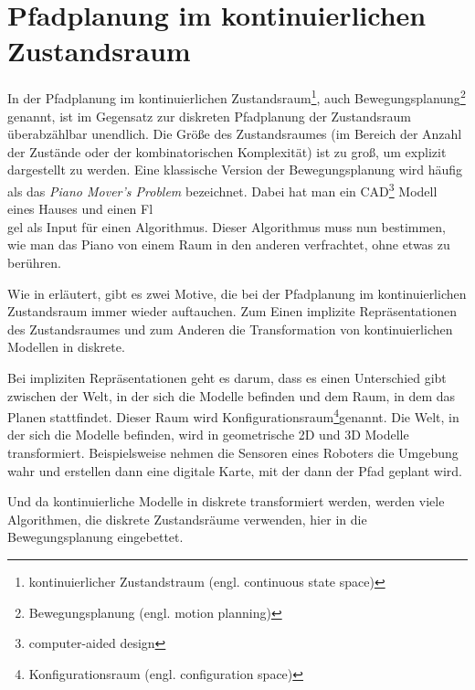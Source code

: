 \section{Pfadplanung im kontinuierlichen Zustandsraum} \label{Kapitel 4.4}
In der Pfadplanung im kontinuierlichen Zustandsraum\footnote{kontinuierlicher Zustandstraum (engl. continuous state space)}, auch Bewegungsplanung\footnote{Bewegungsplanung (engl. motion planning)} genannt, ist im Gegensatz zur diskreten Pfadplanung der Zustandsraum überabzählbar unendlich. Die Größe des Zustandsraumes (im Bereich der Anzahl der Zustände oder der kombinatorischen Komplexität) ist zu groß, um explizit dargestellt zu werden. \cite[~S. 17]{Lav06}
Eine klassische Version der Bewegungsplanung wird häufig als das \textit{Piano Mover's Problem} bezeichnet. Dabei hat man ein CAD\footnote{computer-aided design} Modell eines Hauses und einen Fl\\
gel als Input für einen Algorithmus. Dieser Algorithmus muss nun bestimmen, wie man das Piano von einem Raum in den anderen verfrachtet, ohne etwas zu berühren. %

Wie in \cite[~S. 79 f.]{Lav06} erläutert, gibt es zwei Motive, die bei der Pfadplanung im kontinuierlichen Zustandsraum immer wieder auftauchen. Zum Einen implizite Repräsentationen des Zustandsraumes und zum Anderen die Transformation von kontinuierlichen Modellen in diskrete.

Bei impliziten Repräsentationen geht es darum, dass es einen Unterschied gibt zwischen der Welt, in der sich die Modelle befinden und dem Raum, in dem das Planen stattfindet. Dieser Raum wird Konfigurationsraum\footnote{Konfigurationsraum (engl. configuration space)}genannt. Die Welt, in der sich die Modelle befinden, wird in geometrische 2D und 3D Modelle transformiert. Beispielsweise nehmen die Sensoren eines Roboters die Umgebung wahr und erstellen dann eine digitale Karte, mit der dann der Pfad geplant wird.

Und da kontinuierliche Modelle in diskrete transformiert werden, werden viele Algorithmen, die diskrete Zustandsräume verwenden, hier in die Bewegungsplanung eingebettet.


%
%

